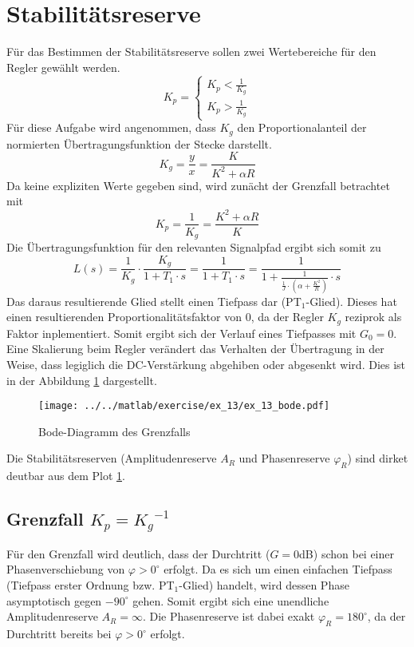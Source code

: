\section{Stabilitätsreserve}
Für das Bestimmen der Stabilitätsreserve sollen zwei Wertebereiche für den
Regler gewählt werden.
\[
	K_p  = \left\{
		\begin{array}{l}
			K_p < \frac{1}{K_g} \\
			K_p > \frac{1}{K_g}
		\end{array}
	\right.
\]
Für diese Aufgabe wird angenommen, dass $K_g$ den Proportionalanteil
der normierten Übertragungsfunktion der Stecke darstellt.
\[
	K_g = \frac{y}{x} = \frac{K}{K^2 + \alpha R}
\]
Da keine expliziten Werte gegeben sind, wird zunächt der Grenzfall
betrachtet mit
\[
	K_p = \frac{1}{K_g} = \frac{K^2 + \alpha R}{K}
\]
Die Übertragungsfunktion für den relevanten Signalpfad ergibt sich somit zu
\[
	L(s) = \frac{1}{K_g} \cdot \frac{K_g}{1 + T_1 \cdot s}
	= \frac{1}{1 + T_1 \cdot s} 
	= \frac{1}{1 + \frac{1}{\frac{1}{J} \cdot \left(
		\alpha + \frac{K^2}{R} \right) } \cdot s }
\]
Das daraus resultierende Glied stellt einen Tiefpass dar (PT$_1$-Glied).
Dieses hat einen resultierenden Proportionalitätsfaktor von 0, da der 
Regler $K_g$ reziprok als Faktor inplementiert. Somit ergibt sich der
Verlauf eines Tiefpasses mit $G_0 = 0$. Eine Skalierung beim Regler
verändert das Verhalten der Übertragung in der Weise, dass legiglich die
DC-Verstärkung abgehiben oder abgesenkt wird. Dies ist in der Abbildung
\ref{fig:ex_13_bode} dargestellt.
\begin{figure}[h!]
	\centering
	\texttt{[image: ../../matlab/exercise/ex\_13/ex\_13\_bode.pdf]}
	\caption{Bode-Diagramm des Grenzfalls}
	\label{fig:ex_13_bode}
\end{figure}
Die Stabilitätsreserven (Amplitudenreserve $A_R$ und Phasenreserve
$\varphi_R$) sind dirket deutbar aus dem Plot \ref{fig:ex_13_bode}.

\subsection{Grenzfall $K_p = {K_g}^{-1}$}
Für den Grenzfall wird deutlich, dass der Durchtritt ($G = 0$dB) schon
bei einer Phasenverschiebung von $\varphi > 0^{\circ}$ erfolgt.
Da es sich um einen einfachen Tiefpass (Tiefpass erster Ordnung bzw.
PT$_1$-Glied) handelt, wird dessen Phase
asymptotisch gegen $-90^{\circ}$ gehen. Somit ergibt sich eine unendliche
Amplitudenreserve $A_R = \infty$. Die Phasenreserve ist dabei exakt
$\varphi_R = 180^{\circ}$, da der Durchtritt bereits bei
$\varphi > 0^{\circ}$ erfolgt.

